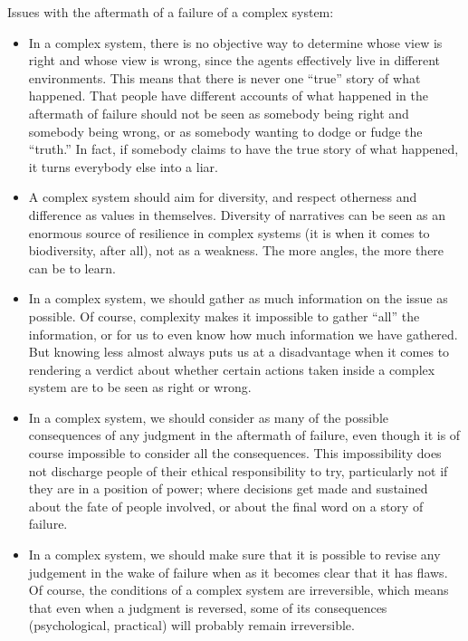 Issues with the aftermath of a failure of a complex system:
\begin{itemize}
\item In a complex system, there is no objective way to determine whose view is right and whose view is wrong, since the agents effectively live in different environments. 
This means that there is never one “true” story of what happened. 
That people have different accounts of what happened in the aftermath of failure should not be seen as somebody being right and somebody being wrong, or as somebody wanting to dodge or fudge the “truth.” 
In fact, if somebody claims to have the true story of what happened, it turns everybody else into a liar.
\item A complex system should aim for diversity, and respect otherness and difference as values in themselves. 
Diversity of narratives can be seen as an enormous source of resilience in complex systems (it is when it comes to biodiversity, after all), not as a weakness. 
The more angles, the more there can be to learn.
\item In a complex system, we should gather as much information on the issue as possible. Of course, complexity makes it impossible to gather “all” the information, or for us to even know how much information we have gathered. 
But knowing less almost always puts us at a disadvantage when it comes to rendering a verdict about whether certain actions taken inside a complex system are to be seen as right or wrong.
\item In a complex system, we should consider as many of the possible consequences of any judgment in the aftermath of failure, even though it is of course impossible to consider all the consequences. 
This impossibility does not discharge people of their ethical responsibility to try, particularly not if they are in a position of power; where decisions get made and sustained about the fate of people involved, or about the final word on a story of failure.
\item In a complex system, we should make sure that it is possible to revise any judgement in the wake of failure when as it becomes clear that it has flaws.
Of course, the conditions of a complex system are irreversible, which means that even when a judgment is reversed, some of its consequences (psychological, practical) will probably remain irreversible.
\end{itemize}
